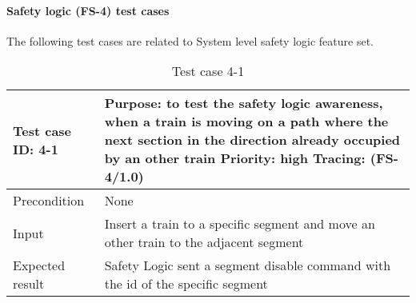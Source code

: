 \paragraph{Safety logic (FS-4) test cases} The following test cases are related to System level safety logic feature set.
\begin{table}[H]
	\caption{Test case 4-1}
	\label{table:TCase-FS4-01}
	\begin{center}
		\renewcommand{\arraystretch}{1.8}
		\begin{tabu} 
			to 0.9 \textwidth
			{  X[0.4, c] X[c] }
			\toprule
			Test case ID: 4-1 & Purpose: to test the safety logic awareness, when a train is moving on a path where the next section in the direction already occupied by an other train \newline Priority: high \newline Tracing: (FS-4/1.0) \\ \midrule
			Precondition      & None                                                                                                                                                                                                          \\
			Input             & Insert a train to a specific segment and move an other train to the adjacent segment                                                                                                                          \\
			Expected result   & Safety Logic sent a segment disable command with the id of the specific segment                                                                                                                               \\ \bottomrule
		\end{tabu}
	\end{center}
\end{table} 


